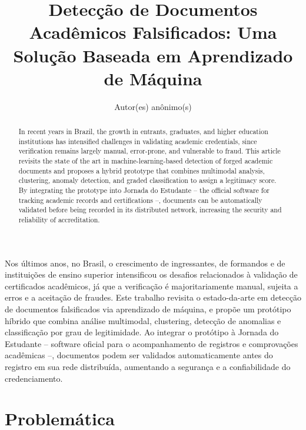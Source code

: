 \documentclass[12pt]{article}
\title{Detecção de Documentos Acadêmicos Falsificados: Uma Solução Baseada em Aprendizado de Máquina}
\author{Autor(es) anônimo(s)\inst{1} }
\begin{document}
 

\maketitle

\begin{abstract}
  In recent years in Brazil, the growth in entrants, graduates, and higher education institutions has intensified challenges in validating academic credentials, since verification remains largely manual, error-prone, and vulnerable to fraud. 
  This article revisits the state of the art in machine-learning-based detection of forged academic documents and proposes a hybrid prototype that combines multimodal analysis, clustering, anomaly detection, and graded classification to assign a legitimacy score. 
  By integrating the prototype into Jornada do Estudante -- the official software for tracking academic records and certifications --, documents can be automatically validated before being recorded in its distributed network, increasing the security and reliability of accreditation.
\end{abstract}
     
\begin{resumo} 
  Nos últimos anos, no Brasil, o crescimento de ingressantes, de formandos e de instituições de ensino superior intensificou os desafios relacionados à validação de certificados acadêmicos, já que a verificação é majoritariamente manual, sujeita a erros e a aceitação de fraudes.
  Este trabalho revisita o estado-da-arte em detecção de documentos falsificados via aprendizado de máquina, e propõe um protótipo híbrido que combina análise multimodal, clustering, detecção de anomalias e classificação por grau de legitimidade.
  Ao integrar o protótipo à Jornada do Estudante -- software oficial para o acompanhamento de registros e comprovações acadêmicas --, documentos podem ser validados automaticamente antes do registro em sua rede distribuída, aumentando a segurança e a confiabilidade do credenciamento.
\end{resumo}


\section{Problemática}
\end{document}
